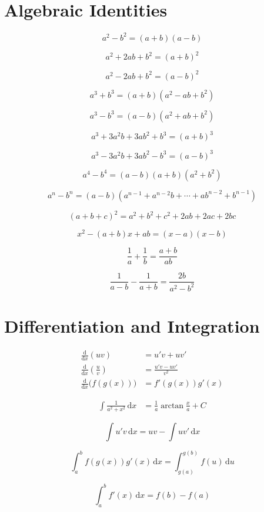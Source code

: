 \documentclass[12pt]{article}
\begin{document}
	\section*{Algebraic Identities}

	\[
	a^2-b^2=(a+b)(a-b)
	\]

	\[
	a^2+2ab+b^2=(a+b)^2
	\]

	\[
	a^2-2ab+b^2=(a-b)^2
	\]

	\[
	a^3+b^3=(a+b)(a^2-ab+b^2)
	\]

	\[
	a^3-b^3=(a-b)(a^2+ab+b^2)
	\]

	\[
	a^3+3a^2b+3ab^2+b^3=(a+b)^3
	\]

	\[
	a^3-3a^2b+3ab^2-b^3=(a-b)^3
	\]

	\[
	a^4-b^4=(a-b)(a+b)(a^2+b^2)
	\]

	\[
	a^n-b^n=(a-b)(a^{n-1}+a^{n-2}b+\cdots+ab^{n-2}+b^{n-1})
	\]

	\[
	(a+b+c)^2=a^2+b^2+c^2+2ab+2ac+2bc
	\]

	\[
	x^2-(a+b)x+ab=(x-a)(x-b)
	\]

	\[
	\frac{1}{a}+\frac{1}{b}=\frac{a+b}{ab}
	\]

	\[
	\frac{1}{a-b}-\frac{1}{a+b}=\frac{2b}{a^2-b^2}
	\]

	\newpage

	\section*{Differentiation and Integration}

	\[
	\begin{aligned}
		\frac{\mathrm{d}}{\mathrm{d}x}(uv)&=u'v+uv' \\[0.5ex]
		\frac{\mathrm{d}}{\mathrm{d}x}\left(\frac{u}{v}\right)&=\frac{u'v-uv'}{v^2} \\[0.5ex]
		\frac{\mathrm{d}}{\mathrm{d}x}\bigl(f(g(x))\bigr)&=f'(g(x))g'(x)
	\end{aligned}
	\]

	\[
	\begin{aligned}
		\int \frac{1}{a^2+x^2}\,\mathrm{d}x&=\frac{1}{a}\arctan\frac{x}{a}+C
	\end{aligned}
	\]

	\[
	\int u'v\,\mathrm{d}x=uv-\int uv'\,\mathrm{d}x
	\]

	\[
	\int_a^b f(g(x))g'(x)\,\mathrm{d}x=\int_{g(a)}^{g(b)} f(u)\,\mathrm{d}u
	\]

	\[
		\int_a^b f'(x)\,\mathrm{d}x=f(b)-f(a)
	\]

	\newpage
\end{document}
